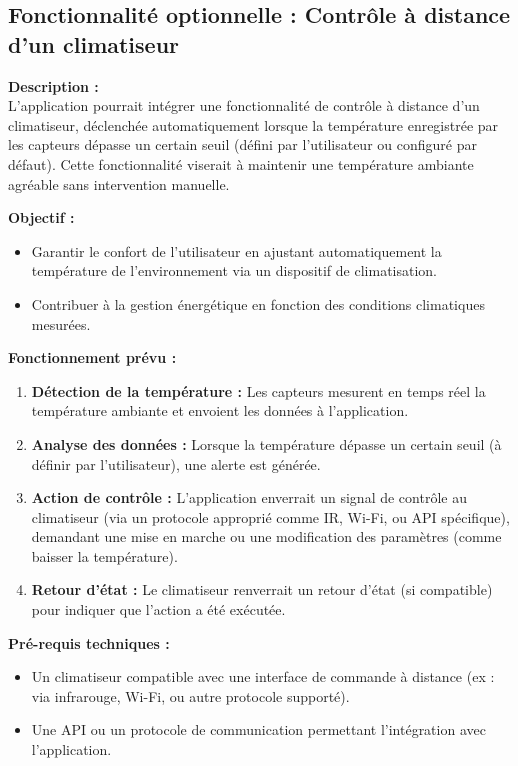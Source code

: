 \documentclass[a4paper,12pt]{article}
\begin{document}
\subsection{ Fonctionnalité optionnelle : Contrôle à distance d'un climatiseur}

\textbf{Description :} \\
L'application pourrait intégrer une fonctionnalité de contrôle à distance d'un climatiseur, déclenchée automatiquement lorsque la température enregistrée par les capteurs dépasse un certain seuil (défini par l'utilisateur ou configuré par défaut). Cette fonctionnalité viserait à maintenir une température ambiante agréable sans intervention manuelle.

\textbf{Objectif :} 
\begin{itemize}
    \item Garantir le confort de l'utilisateur en ajustant automatiquement la température de l'environnement via un dispositif de climatisation.
    \item Contribuer à la gestion énergétique en fonction des conditions climatiques mesurées.
\end{itemize}

\textbf{Fonctionnement prévu :}
\begin{enumerate}
    \item \textbf{Détection de la température :} Les capteurs mesurent en temps réel la température ambiante et envoient les données à l'application.
    \item \textbf{Analyse des données :} Lorsque la température dépasse un certain seuil (à définir par l'utilisateur), une alerte est générée.
    \item \textbf{Action de contrôle :} L'application enverrait un signal de contrôle au climatiseur (via un protocole approprié comme IR, Wi-Fi, ou API spécifique), demandant une mise en marche ou une modification des paramètres (comme baisser la température).
    \item \textbf{Retour d'état :} Le climatiseur renverrait un retour d'état (si compatible) pour indiquer que l'action a été exécutée.
\end{enumerate}

\textbf{Pré-requis techniques :}
\begin{itemize}
    \item Un climatiseur compatible avec une interface de commande à distance (ex : via infrarouge, Wi-Fi, ou autre protocole supporté).
    \item Une API ou un protocole de communication permettant l'intégration avec l'application.
\end{itemize}
\end{document}
